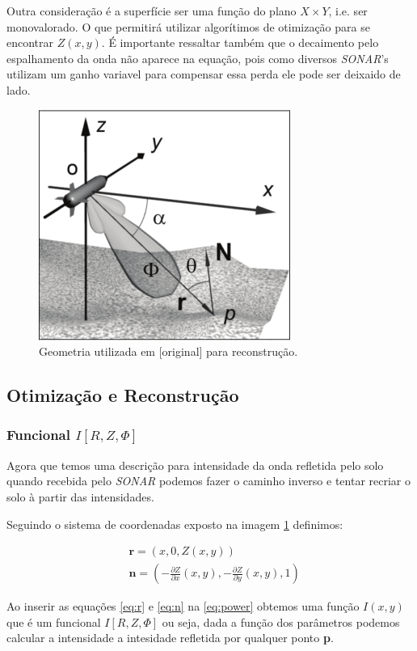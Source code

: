 \documentclass[a4paper,11pt,oneside,brazilian]{article}
\newcommand{\cpar}[2]{\frac{\partial #1}{\partial #2}}
\begin{document}
Outra consideração é a superfície ser uma função do plano \(X \times
Y\), i.e. ser monovalorado. O que permitirá utilizar algorítimos de otimização
para se encontrar \(Z(x,y)\). É importante ressaltar também que o decaimento
pelo espalhamento da onda não aparece na equação, pois como diversos \emph{SONAR}'s
utilizam um ganho variavel para compensar essa perda ele pode ser deixaido de
lado.

 \begin{figure}[ht]
    \centering
    \includegraphics[width=0.4\columnwidth]{sides_geo}
    \caption{Geometria utilizada em [original] para reconstrução.} 
    \label{fig:sidesgeo}
\end{figure}

\subsection{Otimização e Reconstrução}
\subsubsection{Funcional \(I[R,Z,\Phi]\)}
Agora que temos uma descrição para intensidade da onda refletida pelo solo
quando recebida pelo \emph{SONAR} podemos fazer o caminho inverso e tentar
recriar o solo à partir das intensidades.

Seguindo o sistema de coordenadas exposto na imagem \ref{fig:sidesgeo}
definimos:

\begin{align}
&\textbf{r} = (x,0,Z(x,y)) \label{eq:r} \\ 
&\textbf{n} = \left ( -\cpar{Z}{x}(x,y), - \cpar{Z}{y}(x,y),1 \right )
\label{eq:n}
\end{align}

Ao inserir as equações \eqref{eq:r} e \eqref{eq:n} na \eqref{eq:power} obtemos
uma função \(I(x,y)\) que é um funcional \(I[R,Z,\Phi]\) ou seja, dada a função
dos parâmetros podemos calcular a intensidade a intesidade refletida por
qualquer ponto \textbf{p}.
\end{document}
